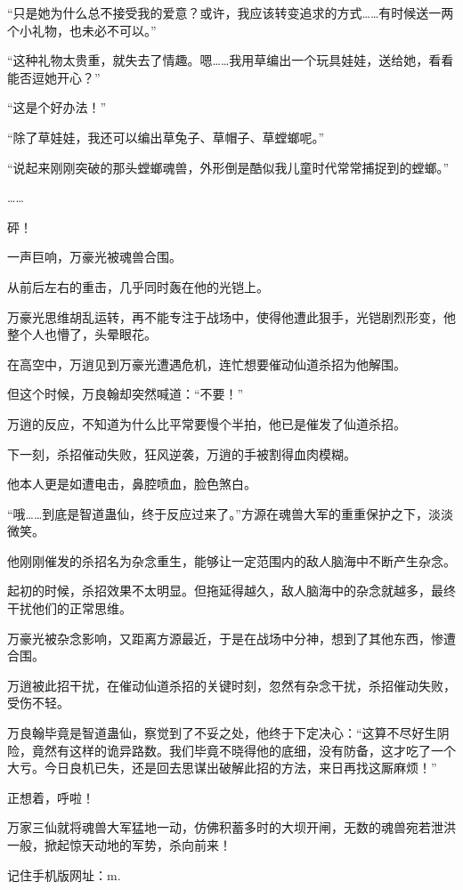 \begin{this_body}
“只是她为什么总不接受我的爱意？或许，我应该转变追求的方式……有时候送一两个小礼物，也未必不可以。”

“这种礼物太贵重，就失去了情趣。嗯……我用草编出一个玩具娃娃，送给她，看看能否逗她开心？”

“这是个好办法！”

“除了草娃娃，我还可以编出草兔子、草帽子、草螳螂呢。”

“说起来刚刚突破的那头螳螂魂兽，外形倒是酷似我儿童时代常常捕捉到的螳螂。”

……

砰！

一声巨响，万豪光被魂兽合围。

从前后左右的重击，几乎同时轰在他的光铠上。

万豪光思维胡乱运转，再不能专注于战场中，使得他遭此狠手，光铠剧烈形变，他整个人也懵了，头晕眼花。

在高空中，万逍见到万豪光遭遇危机，连忙想要催动仙道杀招为他解围。

但这个时候，万良翰却突然喊道：“不要！”

万逍的反应，不知道为什么比平常要慢个半拍，他已是催发了仙道杀招。

下一刻，杀招催动失败，狂风逆袭，万逍的手被割得血肉模糊。

他本人更是如遭电击，鼻腔喷血，脸色煞白。

“哦……到底是智道蛊仙，终于反应过来了。”方源在魂兽大军的重重保护之下，淡淡微笑。

他刚刚催发的杀招名为杂念重生，能够让一定范围内的敌人脑海中不断产生杂念。

起初的时候，杀招效果不太明显。但拖延得越久，敌人脑海中的杂念就越多，最终干扰他们的正常思维。

万豪光被杂念影响，又距离方源最近，于是在战场中分神，想到了其他东西，惨遭合围。

万逍被此招干扰，在催动仙道杀招的关键时刻，忽然有杂念干扰，杀招催动失败，受伤不轻。

万良翰毕竟是智道蛊仙，察觉到了不妥之处，他终于下定决心：“这算不尽好生阴险，竟然有这样的诡异路数。我们毕竟不晓得他的底细，没有防备，这才吃了一个大亏。今日良机已失，还是回去思谋出破解此招的方法，来日再找这厮麻烦！”

正想着，呼啦！

万家三仙就将魂兽大军猛地一动，仿佛积蓄多时的大坝开闸，无数的魂兽宛若泄洪一般，掀起惊天动地的军势，杀向前来！

记住手机版网址：m.

\end{this_body}

